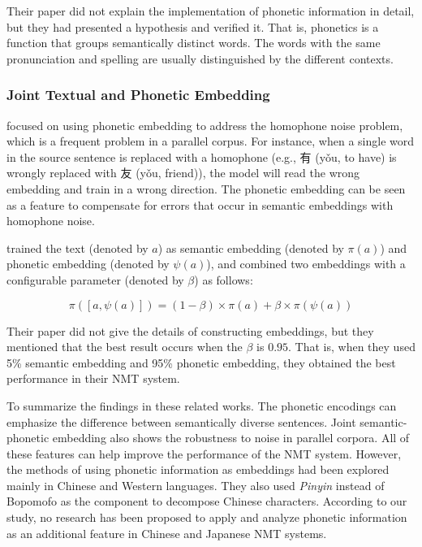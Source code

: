 Their paper did not explain the implementation of phonetic information in detail, but they had presented a hypothesis and verified it. That is, phonetics is a function that groups semantically distinct words. The words with the same pronunciation and spelling are usually distinguished by the different contexts.

\subsubsection{Joint Textual and Phonetic Embedding}

\cite{liu-etal-2019-robust} focused on using phonetic embedding to address the homophone noise problem, which is a frequent problem in a parallel corpus. For instance, when a single word in the source sentence is replaced with a homophone (e.g., 有 (yǒu, to have) is wrongly replaced with 友 (yǒu, friend)), the model will read the wrong embedding and train in a wrong direction. The phonetic embedding can be seen as a feature to compensate for errors that occur in semantic embeddings with homophone noise.

\cite{liu-etal-2019-robust} trained the text (denoted by $a$) as semantic embedding (denoted by $\pi(a)$) and phonetic embedding (denoted by $\psi(a)$), and combined two embeddings with a configurable parameter (denoted by $\beta$) as follows:

\begin{equation*}
	\pi([a, \psi(a)]) = (1-\beta) \times \pi(a) + \beta \times \pi(\psi(a)) 
\end{equation*}

Their paper did not give the details of constructing embeddings, but they mentioned that the best result occurs when the $\beta$ is $0.95$. That is, when they used 5\% semantic embedding and 95\% phonetic embedding, they obtained the best performance in their NMT system.

To summarize the findings in these related works. The phonetic encodings can emphasize the difference between semantically diverse sentences. Joint semantic-phonetic embedding also shows the robustness to noise in parallel corpora. All of these features can help improve the performance of the NMT system. However, the methods of using phonetic information as embeddings had been explored mainly in Chinese and Western languages. They also used \textit{Pinyin} instead of Bopomofo as the component to decompose Chinese characters. According to our study, no research has been proposed to apply and analyze phonetic information as an additional feature in Chinese and Japanese NMT systems.
